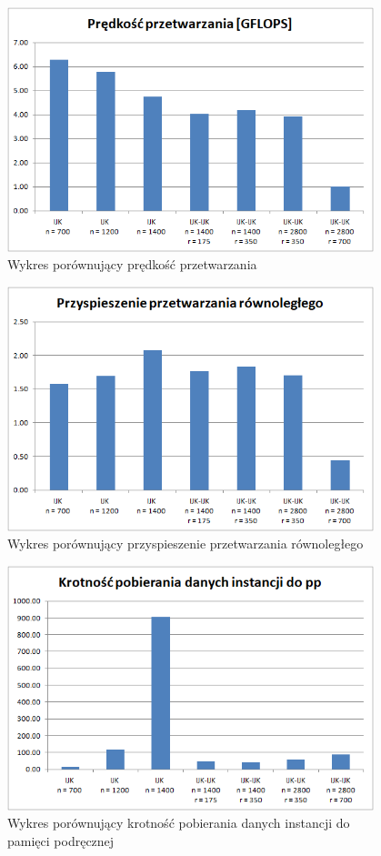\documentclass[12pt,a4paper]{article}
\begin{document}
\begin{figure}[H]
  \centering
    \includegraphics[width=0.95\textwidth]{../Results/charts/GFLOPS.png}
    \caption{Wykres porównujący prędkość przetwarzania}
\end{figure}


\begin{figure}[H]
  \centering
    \includegraphics[width=0.95\textwidth]{../Results/charts/ppr.png}
    \caption{Wykres porównujący przyspieszenie przetwarzania równoległego}
\end{figure}


\begin{figure}[H]
  \centering
    \includegraphics[width=0.95\textwidth]{../Results/charts/krotnosc.png}
    \caption{Wykres porównujący krotność pobierania danych instancji do pamięci podręcznej}
\end{figure}
\end{document}
